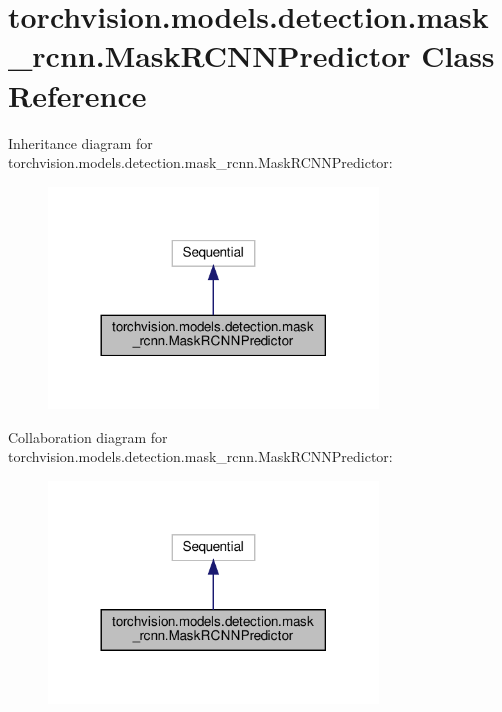 \hypertarget{classtorchvision_1_1models_1_1detection_1_1mask__rcnn_1_1MaskRCNNPredictor}{}\section{torchvision.\+models.\+detection.\+mask\+\_\+rcnn.\+Mask\+R\+C\+N\+N\+Predictor Class Reference}
\label{classtorchvision_1_1models_1_1detection_1_1mask__rcnn_1_1MaskRCNNPredictor}


Inheritance diagram for torchvision.\+models.\+detection.\+mask\+\_\+rcnn.\+Mask\+R\+C\+N\+N\+Predictor\+:
\nopagebreak
\begin{figure}[H]
\begin{center}
\leavevmode
\includegraphics[width=248pt]{classtorchvision_1_1models_1_1detection_1_1mask__rcnn_1_1MaskRCNNPredictor__inherit__graph}
\end{center}
\end{figure}


Collaboration diagram for torchvision.\+models.\+detection.\+mask\+\_\+rcnn.\+Mask\+R\+C\+N\+N\+Predictor\+:
\nopagebreak
\begin{figure}[H]
\begin{center}
\leavevmode
\includegraphics[width=248pt]{classtorchvision_1_1models_1_1detection_1_1mask__rcnn_1_1MaskRCNNPredictor__coll__graph}
\end{center}
\end{figure}
